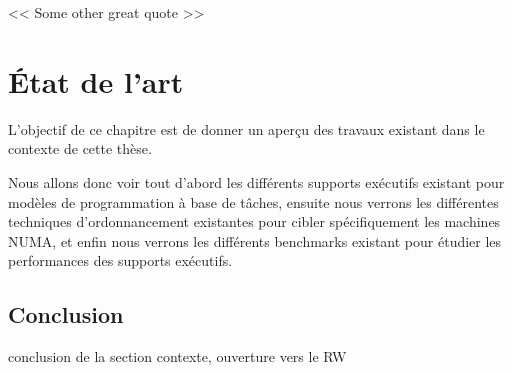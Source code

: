 
\begin{savequote}[6cm]
<< Some other great quote  >>
\end{savequote}
\chapter{État de l'art}\label{chap:rw}
\chaptertoc

L'objectif de ce chapitre est de donner un aperçu des travaux existant dans le contexte de cette thèse.

Nous allons donc voir tout d'abord les différents supports exécutifs existant pour modèles de programmation à base de tâches, ensuite nous verrons les différentes techniques d'ordonnancement existantes pour cibler spécifiquement les machines NUMA, et enfin nous verrons les différents benchmarks existant pour étudier les performances des supports exécutifs.





















\section*{Conclusion}
\begin{todo}
conclusion de la section contexte, ouverture vers le RW
\end{todo}
